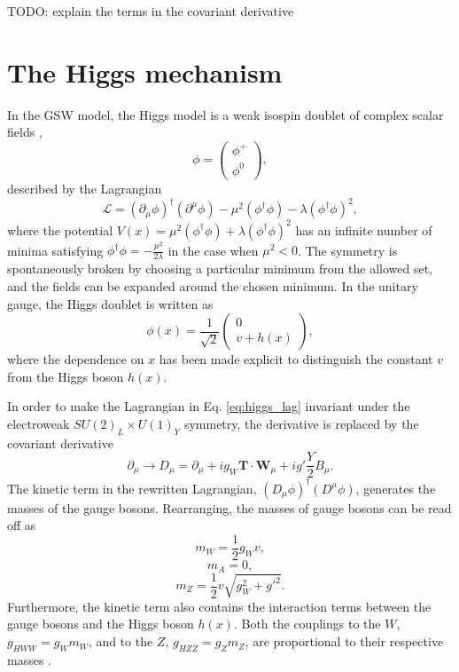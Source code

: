 TODO: explain the terms in the covariant derivative

\section{The Higgs mechanism}

In the GSW model, the Higgs model is a weak isospin doublet of complex scalar fields \cite{Thomson:2013zua},
\begin{equation}
\phi = \begin{pmatrix} \phi^+ \\ \phi^0 \end{pmatrix},
\end{equation}
described by the Lagrangian
\begin{equation}
\mathcal{L} = (\partial_\mu \phi)^\dag (\partial^\mu \phi) - \mu^2(\phi^\dag\phi) - \lambda(\phi^\dag \phi)^2,
\label{eq:higgs_lag}
\end{equation}
where the potential $V(x) = \mu^2(\phi^\dag\phi) + \lambda(\phi^\dag \phi)^2$
has an infinite number of minima satisfying $\phi^\dag \phi = -\frac{\mu^2}{2\lambda}$
in the case when $\mu^2 < 0$. The symmetry is spontaneously broken by choosing a
particular minimum from the allowed set, and the fields can be expanded around the chosen minimum.
In the unitary gauge, the Higgs doublet is written as
\begin{equation}
\phi(x) = \frac{1}{\sqrt{2}} \begin{pmatrix} 0 \\ v + h(x) \end{pmatrix},
\end{equation}
where the dependence on $x$ has been made explicit to distinguish the constant
$v$ from the Higgs boson $h(x)$.

In order to make the Lagrangian in Eq. \ref{eq:higgs_lag} invariant under the electroweak
$SU(2)_L \times U(1)_Y$ symmetry, the derivative is replaced by the covariant
derivative \cite{Thomson:2013zua}
\begin{equation}
\partial_\mu \rightarrow D_\mu = \partial_\mu + i g_W \mathbf{T} \cdot \mathbf{W}_\mu
+ i g' \frac{Y}{2} B_\mu.
\end{equation}
The kinetic term in the rewritten Lagrangian, $(D_\mu \phi)^\dag (D^\mu \phi)$, generates the
masses of the gauge bosons. Rearranging, the masses of gauge bosons can be read off as
\begin{equation}
m_W = \frac{1}{2} g_W v,
\end{equation}
\begin{equation}
m_A = 0,
\end{equation}
\begin{equation}
m_Z = \frac{1}{2}v\sqrt{g_W^2 + g'^2}.
\end{equation}
Furthermore, the kinetic term also contains the interaction terms between the gauge bosons
and the Higgs boson $h(x)$. Both the couplings to the $W$, $g_{HWW}=g_W m_W$, and to the $Z$,
$g_{HZZ} = g_Z m_Z$, are proportional to their respective masses \cite{Thomson:2013zua}.

